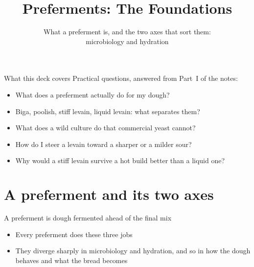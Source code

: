 \documentclass[aspectratio=169,11pt]{beamer}
\title[Foundations]{Preferments: The Foundations}
\subtitle{What a preferment is, and the two axes that sort them:\\
  microbiology and hydration}
\begin{document}
\begin{frame}[plain]\titlepage\end{frame}

\begin{frame}{What this deck covers}
  Practical questions, answered from Part~I of the notes:
  \medskip
  \begin{itemize}\setlength{\itemsep}{0.5em}
    \item What does a preferment actually do for my dough?
    \item Biga, poolish, stiff levain, liquid levain: what separates them?
    \item What does a wild culture do that commercial yeast cannot?
    \item How do I steer a levain toward a sharper or a milder sour?
    \item Why would a stiff levain survive a hot build better than a liquid one?
  \end{itemize}
\end{frame}

\section{A preferment and its two axes}

\begin{frame}{A preferment is dough fermented ahead of the final mix}
  \centering
  \par\medskip\raggedright
  \begin{itemize}
    \item Every preferment does these three jobs
    \item They diverge sharply in microbiology and hydration, and so in how
      the dough behaves and what the bread becomes
  \end{itemize}
\end{frame}
\end{document}
